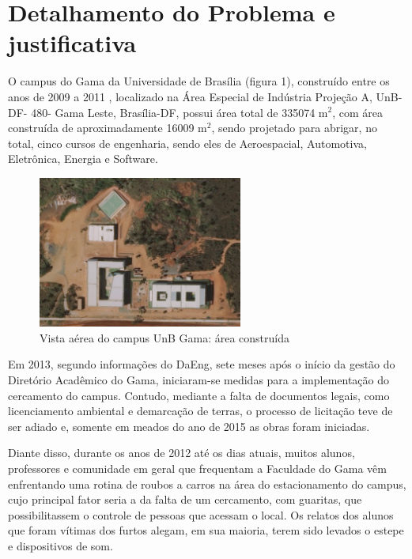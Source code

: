 \section{Detalhamento do Problema e justificativa} %
\label{sec:detalhamentoProblema}

O campus do Gama da Universidade de Brasília (figura 1), construído entre os anos de 2009 a 2011 , localizado na Área Especial de Indústria Projeção A, UnB- DF- 480- Gama Leste, Brasília-DF, possui área total de 335074 m$^2$, com área construída de aproximadamente 16009 m$^2$, sendo projetado para abrigar, no total, cinco cursos de engenharia, sendo eles de Aeroespacial, Automotiva, Eletrônica, Energia e Software.

\begin{figure}[H]
	\centering
	\includegraphics[width=0.6\textwidth]{figuras/fga1}
	\caption[Vista aérea do campus UnB Gama: área construída]{Vista aérea do campus UnB Gama: área construída~\cite{mapa1}}
	\label{img:fga1}
\end{figure}


Em 2013, segundo informações do DaEng, sete meses após o início da gestão do Diretório Acadêmico do Gama, iniciaram-se medidas para a implementação do cercamento do campus. Contudo, mediante a falta de documentos legais, como licenciamento ambiental e demarcação de terras, o processo de licitação teve de ser adiado e, somente em meados do ano de 2015 as obras foram iniciadas.

Diante disso, durante os anos de 2012 até os dias atuais, muitos alunos, professores e comunidade em geral que frequentam a Faculdade do Gama vêm enfrentando uma rotina de roubos a carros na área do estacionamento do campus, cujo principal fator seria a da falta de um cercamento, com guaritas, que possibilitassem o controle de pessoas que acessam o local. Os relatos dos alunos que foram vítimas dos furtos alegam, em sua maioria, terem sido levados o estepe e dispositivos de som.

